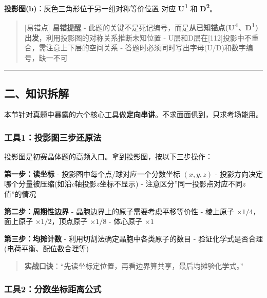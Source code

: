 \textbf{投影图(b)}：灰色三角形位于另一组对称等价位置 \箭 对应 \textbf{U\textsuperscript{1}} 和 \textbf{D\textsuperscript{2}}。

\begin{quote}
{[}易错点{]} \textbf{易错提醒}
- 此题的关键不是死记编号，而是\textbf{从已知锚点(U\textsuperscript{4}、D\textsuperscript{1})出发}，利用投影图的对称关系推断未知位置
- U层和D层在{[}112{]}投影中不重合，需注意上下层的空间关系
- 答题时必须同时写出字母(U/D)和数字编号，缺一不可
\end{quote}

\begin{center}\rule{0.5\linewidth}{0.5pt}\end{center}

\subsection{二、知识拆解}\label{ux4e8cux77e5ux8bc6ux62c6ux89e3-3}

本节针对真题中暴露的六个核心工具做\textbf{定向串讲}。不求面面俱到，只求考场能用。

\subsubsection{工具1：投影图三步还原法}\label{ux5de5ux51771ux6295ux5f71ux56feux4e09ux6b65ux8fd8ux539fux6cd5}

投影图是初赛晶体题的高频入口。拿到投影图，按以下三步操作：

\textbf{第一步：读坐标}
- 投影图中每个点/球对应一个分数坐标 \((x, y, z)\)
- 投影方向决定哪个分量被压缩(如沿\(c\)轴投影\箭\(z\)坐标不显示)
- 注意区分''同一投影点对应不同\(z\)值''的情况

\textbf{第二步：周期性边界}
- 晶胞边界上的原子需要考虑平移等价性
- 棱上原子 \(\times 1/4\)，面上原子 \(\times 1/2\)，顶点原子 \(\times 1/8\)
- 体心原子 \(\times 1\)

\textbf{第三步：均摊计数}
- 利用切割法确定晶胞中各类原子的数目
- 验证化学式是否合理(电荷平衡、配位数合理等)

\begin{quote}
\textbf{实战口诀}：``先读坐标定位置，再看边界算共享，最后均摊验化学式。''
\end{quote}

\subsubsection{工具2：分数坐标距离公式}\label{ux5de5ux51772ux5206ux6570ux5750ux6807ux8dddux79bbux516cux5f0f}

